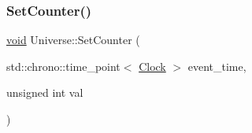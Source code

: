 \mbox{\label{class_universe_aa22202ae740eb1355529afcb13285e91}} 
\subsubsection{\texorpdfstring{Set\+Counter()}{SetCounter()}}
{\footnotesize\ttfamily \mbox{\hyperlink{glad_8h_a950fc91edb4504f62f1c577bf4727c29}{void}} Universe\+::\+Set\+Counter (\begin{DoxyParamCaption}\item[{std\+::chrono\+::time\+\_\+point$<$ \mbox{\hyperlink{universe_8h_a0ef8d951d1ca5ab3cfaf7ab4c7a6fd80}{Clock}} $>$}]{event\+\_\+time,  }\item[{unsigned int}]{val }\end{DoxyParamCaption})\hspace{0.3cm}{\ttfamily [virtual]}}



